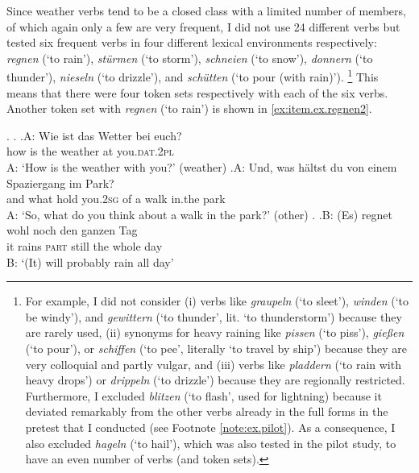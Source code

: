 Since weather verbs tend to be a closed class with a limited number of members, of which again only a few are very frequent, I did not use 24 different verbs but tested six frequent verbs in four different lexical environments respectively:
\textit{regnen} (`to rain'), \textit{stürmen} (`to storm'), \textit{schneien} (`to snow'), \textit{donnern} (`to thunder'), \textit{nieseln} (`to drizzle'), and \textit{schütten} (`to pour (with rain)').%
\footnote{For example, I did not consider (i) verbs like \textit{graupeln} (`to sleet'), \textit{winden} (`to be windy'), and \textit{gewittern} (`to thunder', lit. `to thunderstorm') because they are rarely used, (ii) synonyms for heavy raining like \textit{pissen} (`to piss'), \textit{gießen} (`to pour'), or \textit{schiffen} (`to pee', literally `to travel by ship') because they are very colloquial and partly vulgar, and (iii) verbs like \textit{pladdern} (`to rain with heavy drops') or \textit{drippeln} (`to drizzle') because they are regionally restricted.
Furthermore, I excluded \textit{blitzen} (`to flash', used for lightning) because it deviated remarkably from the other verbs already in the full forms in the pretest that I conducted (see Footnote \ref{note:ex.pilot}).
As a consequence, I also excluded \textit{hageln} (`to hail'), which was also tested in the pilot study, to have an even number of verbs (and token sets).
}
This means that there were four token sets respectively with each of the six verbs.
Another token set with \textit{regnen} (`to rain') is shown in \ref{ex:item.ex.regnen2}.

\ex.\label{ex:item.ex.regnen2}
\a.
\ag.A: Wie ist das Wetter bei euch?\\
{} how is the weather at you.\textsc{dat.2pl}\\
A: `How is the weather with you?' \hfill (weather)
\bg.A: Und, was hältst du von einem Spaziergang im Park?	\\
{} and what hold you.\textsc{2sg} of a walk in.the park\\
A: `So, what do you think about a walk in the park?' \hfill (other)
\z.
\bg.B: (Es) regnet wohl noch den ganzen Tag\\
{} it rains \textsc{part} still the whole day \\
B: `(It) will probably rain all day\phantom{mi}'

